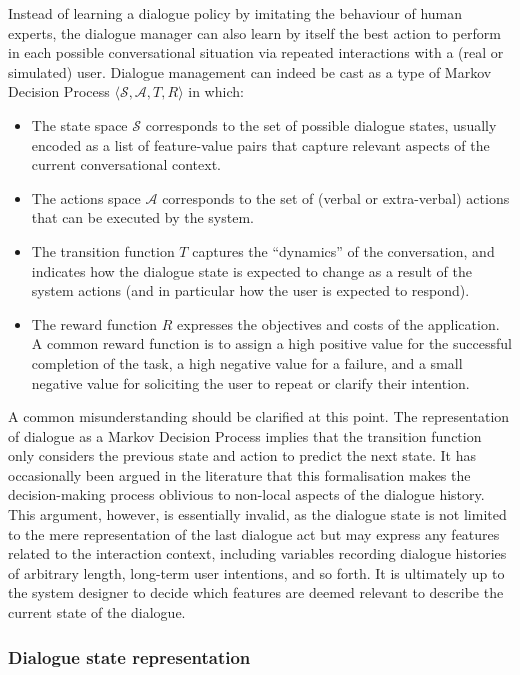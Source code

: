 Instead of learning a dialogue policy by imitating the behaviour of human experts, the dialogue manager can also learn by itself the best action to perform in each possible conversational situation via repeated interactions with a (real or simulated) user.  Dialogue management can indeed be cast as a type of Markov Decision Process $\langle \mathcal{S}, \mathcal{A}, T, R \rangle$ in which: 
\begin{itemize}
\item The state space $\mathcal{S}$ corresponds to the set of possible dialogue states, usually encoded as a list of feature-value pairs that capture relevant aspects of the current conversational context.
\item The actions space $\mathcal{A}$ corresponds to the set of (verbal or extra-verbal) actions that can be executed by the system.
\item The transition function $T$ captures the ``dynamics'' of the conversation, and indicates how the dialogue state is expected to change as a result of the system actions (and in particular how the user is expected to respond). 
\item The reward function $R$ expresses the objectives and costs of the application. A common reward function is to assign a high positive value for the successful completion of the task, a high negative value for a failure, and a small negative value for soliciting the user to repeat or clarify their intention.  
\end{itemize}

A common misunderstanding should be clarified at this point. The representation of dialogue as a Markov Decision Process implies that the transition function only considers the previous state and action to predict the next state.  It has occasionally been argued in the literature that this formalisation makes the decision-making process oblivious to non-local aspects of the dialogue history. This argument, however, is essentially invalid, as the dialogue state is not limited to the mere representation of the last dialogue act but may express any features related to the interaction context, including variables recording dialogue histories of arbitrary length, long-term user intentions, and so forth.  It is ultimately up to the system designer to decide which features are deemed relevant to describe the current state of the dialogue.

\subsubsection*{Dialogue state representation}

